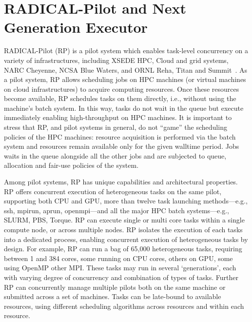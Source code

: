 \documentclass{webofc}
\begin{document}
\section{RADICAL-Pilot and Next Generation Executor}\label{sec:rp}

RADICAL-Pilot (RP) is a pilot system which enables task-level concurrency on
a variety of infrastructures, including XSEDE HPC, Cloud and grid systems,
NARC Cheyenne, NCSA Blue Waters, and ORNL Reha, Titan and
Summit~\cite{merzky2018using}. As a pilot system, RP allows scheduling jobs
on HPC machines (or virtual machines on cloud infrastructures) to acquire
computing resources. Once these resources become available, RP schedules
tasks on them directly, i.e., without using the machine’s batch system. In
this way, tasks do not wait in the queue but execute immediately enabling
high-throughput on HPC machines. It is important to stress that RP, and pilot
systems in general, do not “game” the scheduling policies of the HPC
machines: resource acquisition is performed via the batch system and
resources remain available only for the given walltime period. Jobs waits in
the queue alongside all the other jobs and are subjected to queue, allocation
and fair-use policies of the system.
	
Among pilot systems, RP has unique capabilities and architectural properties.
RP offers concurrent execution of heterogeneous tasks on the same pilot,
supporting both CPU and GPU, more than twelve task launching methods---e.g.,
ssh, mpirun, aprun, openmpi---and all the major HPC batch systems---e.g.,
SLURM, PBS, Torque. RP can execute single or multi core tasks within a single
compute node, or across multiple nodes. RP isolates the execution of each
tasks into a dedicated process, enabling concurrent execution of
heterogeneous tasks by design. For example, RP can run a bag of 65,000
heterogeneous tasks, requiring between 1 and 384 cores, some running on CPU
cores, others on GPU, some using OpenMP other MPI. These tasks may run in
several ‘generations’, each with varying degree of concurrency and
combination of types of tasks. Further RP can concurrently manage multiple
pilots both on the same machine or submitted across a set of machines. Tasks
can be late-bound to available resources, using different scheduling
algorithms across resources and within each resource.
	
\end{document}
